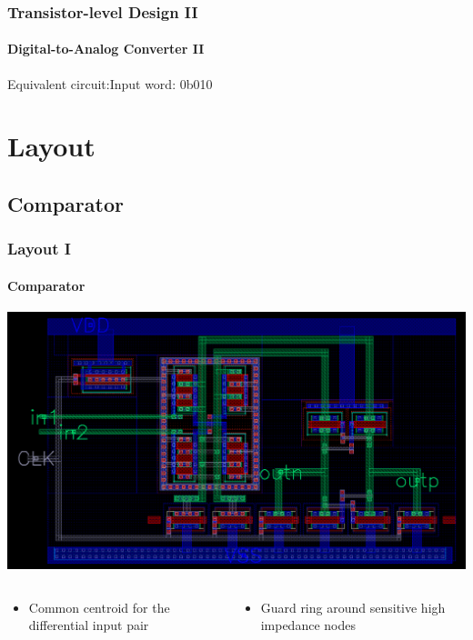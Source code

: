 \documentclass{beamer}
\begin{document}
  \begin{frame}
    \frametitle{Transistor-level Design II}
    \framesubtitle{Digital-to-Analog Converter II}
    Equivalent circuit:\hfill Input word: \alert{0b010}
    \vspace*{1em}
    \begin{center}
    
    \end{center}
  \end{frame}

  \section{Layout}
  \subsection{Comparator}
  \begin{frame}
    \frametitle{Layout I}
    \framesubtitle{Comparator}
    \includegraphics[width=\textwidth]{img/comparator_layout}

    \begin{columns}
    \begin{column}{0.5\textwidth}
    \begin{itemize}
    \item Common centroid for the differential input pair
    \end{itemize}
    \end{column}
    \begin{column}{0.5\textwidth}
    \begin{itemize}
    \item<2-> Guard ring around sensitive high impedance nodes
    \end{itemize}
    \end{column}
    \end{columns}
  \end{frame}
\end{document}
